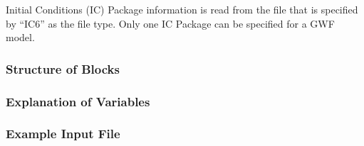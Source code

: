 Initial Conditions (IC) Package information is read from the file that is specified by ``IC6'' as the file type.  Only one IC Package can be specified for a GWF model. 

\vspace{5mm}
\subsubsection{Structure of Blocks}



\vspace{5mm}
\subsubsection{Explanation of Variables}
\begin{description}

\end{description}

\vspace{5mm}
\subsubsection{Example Input File}


